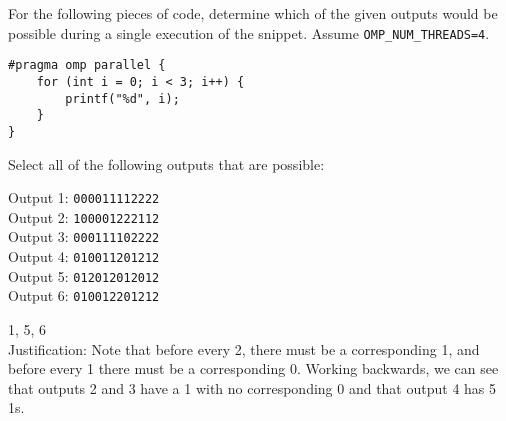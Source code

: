 \begin{blocksection}

\question
For the following pieces of code, determine which of the given outputs would be possible during a single execution of the snippet. Assume \texttt{OMP\_NUM\_THREADS=4}.

\begin{verbatim}
#pragma omp parallel {
    for (int i = 0; i < 3; i++) {
        printf("%d", i);
    }
}
\end{verbatim}

Select all of the following outputs that are possible:

Output 1: \texttt{000011112222} \\
Output 2: \texttt{100001222112} \\
Output 3: \texttt{000111102222} \\
Output 4: \texttt{010011201212} \\
Output 5: \texttt{012012012012} \\
Output 6: \texttt{010012201212} \\

\begin{solution}[0.5in]
1, 5, 6 \\
Justification: Note that before every 2, there must be a corresponding 1, and before every 1 there must be a corresponding 0. Working backwards, we can see that outputs 2 and 3 have a 1 with no corresponding 0 and that output 4 has 5 1s. 

\end{solution}
\end{blocksection}